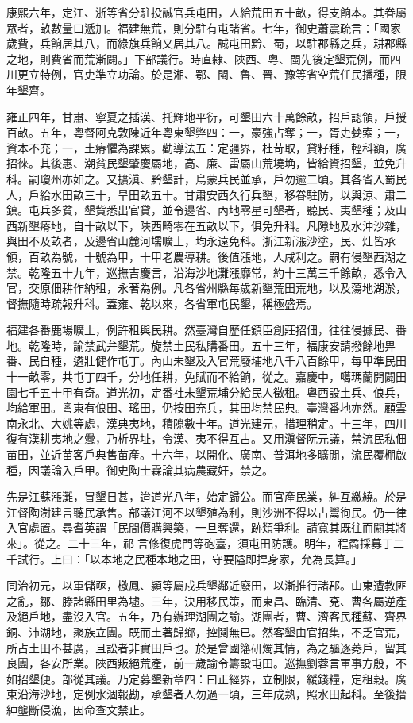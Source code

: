 \begin{pinyinscope}
康熙六年，定江、浙等省分駐投誠官兵屯田，人給荒田五十畝，得支餉本。其眷屬眾者，畝數量口遞加。福建無荒，則分駐有屯諸省。七年，御史蕭震疏言：「國家歲費，兵餉居其八，而綠旗兵餉又居其八。誠屯田黔、蜀，以駐郡縣之兵，耕郡縣之地，則費省而荒漸闢。」下部議行。時直隸、陜西、粵、閩先後定墾荒例，而四川更立特例，官吏準立功論。於是湘、鄂、閩、魯、晉、豫等省空荒任民播種，限年墾齊。

雍正四年，甘肅、寧夏之插漢、托輝地平衍，可墾田六十萬餘畝，招戶認領，戶授百畝。五年，粵督阿克敦陳近年粵東墾弊四：一，豪強占奪；一，胥吏婪索；一，資本不充；一，土瘠懼為課累。勸導法五：定疆界，杜苛取，貸籽種，輕科額，廣招徠。其後惠、潮貧民墾肇慶屬地，高、廉、雷屬山荒墝埆，皆給資招墾，並免升科。嗣瓊州亦如之。又擴滇、黔墾計，烏蒙兵民並承，戶勿逾二頃。其各省入蜀民人，戶給水田畝三十，旱田畝五十。甘肅安西久行兵墾，移眷駐防，以與涼、肅二鎮。屯兵多貧，墾貲悉出官貸，並令邊省、內地零星可墾者，聽民、夷墾種；及山西新墾瘠地，自十畝以下，陜西畸零在五畝以下，俱免升科。凡隙地及水沖沙雜，與田不及畝者，及邊省山麓河壖曠土，均永遠免科。浙江新漲沙塗，民、灶皆承領，百畝為號，十號為甲，十甲老農導耕。後值漲地，人咸利之。嗣有侵墾西湖之禁。乾隆五十九年，巡撫吉慶言，沿海沙地灘漲靡常，約十三萬三千餘畝，悉令入官，交原佃耕作納租，永著為例。凡各省州縣每歲新墾荒田荒地，以及蕩地湖淤，督撫隨時疏報升科。蓋雍、乾以來，各省軍屯民墾，稱極盛焉。

福建各番鹿場曠土，例許租與民耕。然臺灣自歷任鎮臣創莊招佃，往往侵據民、番地。乾隆時，諭禁武弁墾荒。旋禁土民私購番田。五十三年，福康安請撥餘地畀番、民自種，遴壯健作屯丁。內山未墾及入官荒廢埔地八千八百餘甲，每甲準民田十一畝零，共屯丁四千，分地任耕，免賦而不給餉，從之。嘉慶中，噶瑪蘭開闢田園七千五十甲有奇。道光初，定番社未墾荒埔分給民人徵租。粵西設土兵、俍兵，均給軍田。粵東有俍田、瑤田，仍按田充兵，其田均禁民典。臺灣番地亦然。顧雲南永北、大姚等處，漢典夷地，積隙數十年。道光建元，措理稍定。十三年，四川復有漢耕夷地之釁，乃析界址，令漢、夷不得互占。又用滇督阮元議，禁流民私佃苗田，並近苗客戶典售苗產。十六年，以開化、廣南、普洱地多曠閒，流民覆棚啟種，因議論入戶甲。御史陶士霖論其病農藏奸，禁之。

先是江蘇漲灘，冒墾日甚，迨道光八年，始定歸公。而官產民業，糾互繳繞。於是江督陶澍建言聽民承售。部議江河不以墾殖為利，則沙洲不得以占鬻徇民。仍一律入官處置。尋耆英謂「民間價購興築，一旦奪還，跡類爭利。請寬其既往而閼其將來」。從之。二十三年，祁言修復虎門等砲臺，須屯田防護。明年，程矞採募丁二千試行。上曰：「以本地之民種本地之田，守要隘即捍身家，允為長算。」

同治初元，以軍儲亟，檄鳳、潁等屬戍兵墾鄰近廢田，以漸推行諸郡。山東遭教匪之亂，鄒、滕諸縣田里為墟。三年，決用移民策，而東昌、臨清、兗、曹各屬逆產及絕戶地，盡沒入官。五年，乃有辦理湖團之諭。湖團者，曹、濟客民種蘇、齊界銅、沛湖地，聚族立團。既而土著歸鄉，控鬩無已。然客墾由官招集，不乏官荒，所占土田不甚廣，且訟者非實田戶也。於是曾國籓研燭其情，為之驅逐莠戶，留其良團，各安所業。陜西叛絕荒產，前一歲諭令籌設屯田。巡撫劉蓉言軍事方殷，不如招墾便。部從其議。乃定募墾新章四：曰正經界，立制限，緩錢糧，定租穀。廣東沿海沙地，定例水涸報勘，承墾者人勿過一頃，三年成熟，照水田起科。至後搢紳壟斷侵漁，因命查文禁止。


\end{pinyinscope}
